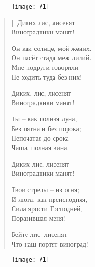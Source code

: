 \documentclass[12pt,a5paper,twoside]{article}
\newcommand{\pict}[1]{\thispagestyle{empty}\begin{figure}[H]\begin{center}\texttt{[image: \#1]}\end{center}\end{figure}\newpage}
\begin{document}
\pict{picts/Pesn_pesney} 
%


	
\settowidth{\versewidth}{Диких лис, лисенят}
\begin{verse}[\versewidth]
Диких лис, лисенят\\
Виноградники манят!

Он как солнце, мой жених.\\
Он пасёт стада меж лилий.\\
Мне подруги говорили\\
Не ходить туда без них!

Диких, лис, лисенят\\
Виноградники манят!

Ты – как полная луна,\\
Без пятна и без порока;\\
Непочатая до срока\\
Чаша, полная вина.

Диких лис, лисенят\\
Виноградники манят!

Твои стрелы – из огня;\\
И люта, как преисподняя,\\
Сила ярости Господней,\\
Поразившая меня!

Бейте лис, лисенят,\\
Что наш портят виноград!
\end{verse}
\newpage




\pict{picts/I_vot_noyabr_Otkrila_dali_osen} 
%
\end{document}
